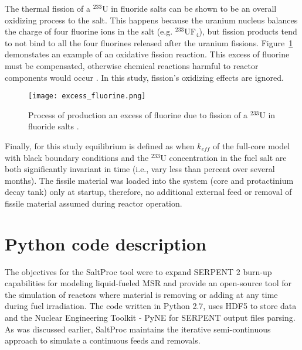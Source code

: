 The thermal fission of a $^{233}$U in fluoride salts can be shown to be an overall oxidizing process to the salt. This happens because the uranium nucleus balances the charge of four fluorine ions in the salt (e.g. $^{233}$UF$_4$), but fission products tend to not bind to all the four fluorines released after the uranium fissions. Figure~\ref{fig:excess_fluorine} demonstates an example of an oxidative fission reaction. This excess of fluorine must be compensated, otherwise chemical reactions harmful to reactor components would occur \cite{ridley_method_2017}. In this study, fission’s oxidizing effects are ignored.

\begin{figure}[htp!] %
  \centering
  \vspace{-0.3em}
  \texttt{[image: excess\_fluorine.png]}
  \caption{Process of production an excess of fluorine due to fission of a $^{233}$U in fluoride salts \cite{ridley_method_2017}.}
  \vspace{-0.6em}
  \label{fig:excess_fluorine}
\end{figure}
\FloatBarrier

Finally, for this study equilibrium is defined as when $k_{eff}$ of the full-core model with black boundary conditions and the $^{233}$U concentration in the fuel salt are both significantly invariant in time (i.e., vary less than percent over several months). The fissile material was loaded into the system (core and protactinium decay tank) only at startup, therefore, no additional external feed or removal of fissile material assumed during reactor operation.

\section{Python code description}
The objectives for the SaltProc tool were to expand SERPENT 2 burn-up capabilities for modeling liquid-fueled \gls{MSR} and provide an open-source tool for the simulation of reactors where material is removing or adding at any time during fuel irradiation. The code written in Python 2.7, uses HDF5 \cite{the_hdf_group_hierarchical_nodate} to store data and the Nuclear Engineering Toolkit - PyNE \cite{scopatz_pyne:_2012} for SERPENT output files parsing. As was discussed earlier, SaltProc maintains the iterative semi-continuous approach to simulate a continuous feeds and removals.

